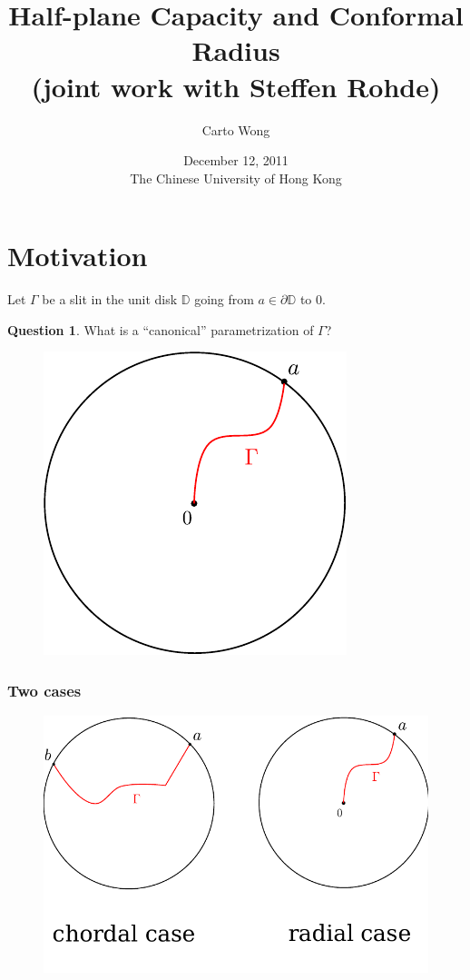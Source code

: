 \documentclass[xcolor=pdftex,dvipsnames,table]{beamer}
\title{Half-plane Capacity and Conformal Radius\\
       (joint work with Steffen Rohde)}
\author{Carto Wong}
\institute{University of Washington}
\date{December 12, 2011\\The Chinese University of Hong Kong}
\newcommand{\bbD}{\mathbb{D}}
\newcommand{\gR}{\Gamma}
\theoremstyle{definition}
\newtheorem{question}{Question}
\begin{document}
\maketitle

\section{Motivation}

\begin{frame}
  Let $\gR$ be a slit in the unit disk $\bbD$ going from $a \in \partial \bbD$ to 0.
  \begin{question}
    What is a ``canonical'' parametrization of $\gR$?
  \end{question}
  \begin{figure}
    \includegraphics[scale=0.8]{radialSlit.pdf}
  \end{figure}
\end{frame}

\begin{frame}
  \frametitle{Two cases}
  \begin{figure}
    \includegraphics[scale=0.6]{twoCases.pdf}
  \end{figure}
\end{frame}
\end{document}
